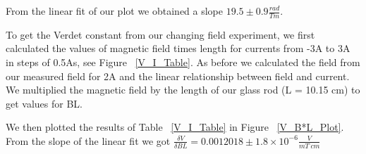 \documentclass[prb,preprint]{revtex4-1}
\begin{document}
From the linear fit of our plot we obtained a slope $19.5 \pm0.9 \frac{rad}{Tm}$.

To get the Verdet constant from our changing field experiment, we first calculated the values of magnetic field times length for currents from -3A to 3A in steps of 0.5As, see Figure ~\ref{V_I_Table}. As before we calculated the field from our measured field for 2A and the linear relationship between field and current. We multiplied the magnetic field by the length of our glass rod (L = 10.15 cm) to get values for BL. 


We then plotted the results of Table ~\ref{V_I_Table} in Figure ~\ref{V_B*L_Plot}. From the slope of the linear fit we got $\frac{\delta V}{\delta BL} = 0.0012018 \pm 1.8 \times 10^{-6} \frac{V}{mT\ cm}$
\end{document}
